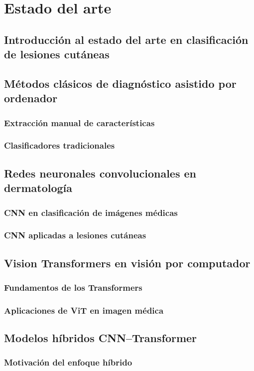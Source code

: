 \chapter{Estado del arte}
\section{Introducción al estado del arte en clasificación de lesiones cutáneas}
\section{Métodos clásicos de diagnóstico asistido por ordenador}
\subsection{Extracción manual de características}
\subsection{Clasificadores tradicionales}
\section{Redes neuronales convolucionales en dermatología}
\subsection{CNN en clasificación de imágenes médicas}
\subsection{CNN aplicadas a lesiones cutáneas}
\section{Vision Transformers en visión por computador}
\subsection{Fundamentos de los Transformers}
\subsection{Aplicaciones de ViT en imagen médica}
\section{Modelos híbridos CNN–Transformer}
\subsection{Motivación del enfoque híbrido}
